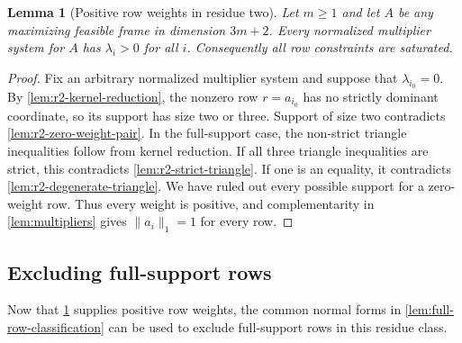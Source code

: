 \documentclass[11pt]{article}
\numberwithin{equation}{section}
\newtheorem{lemma}[lemma]{Lemma}
\theoremstyle{definition}
\theoremstyle{definition}
\begin{document}
\begin{lemma}[Positive row weights in residue two]
\label{lem:r2-all-active}
Let $m\ge1$ and let $A$ be any maximizing feasible frame in
dimension $3m+2$. Every normalized multiplier system for $A$
has $\lambda_i>0$ for
all $i$. Consequently all row constraints are saturated.
\end{lemma}
\begin{proof}
Fix an arbitrary normalized multiplier system and suppose that
$\lambda_{i_0}=0$. By \cref{lem:r2-kernel-reduction}, the
nonzero row $r=a_{i_0}$ has no strictly dominant coordinate, so its
support has size two or three. Support of size two contradicts
\cref{lem:r2-zero-weight-pair}. In the full-support case, the
non-strict triangle inequalities follow from kernel reduction.
If all three triangle inequalities are strict, this contradicts
\cref{lem:r2-strict-triangle}. If one is an equality, it contradicts
\cref{lem:r2-degenerate-triangle}. We have ruled out every possible support for a zero-weight row.
Thus every weight is positive, and complementarity in
\cref{lem:multipliers} gives
$\|a_i\|_1=1$ for every row.
\end{proof}

\subsection{Excluding full-support rows}
Now that \cref{lem:r2-all-active} supplies positive row weights,
the common normal forms in \cref{lem:full-row-classification}
can be used to exclude full-support rows in this residue class.
\end{document}
